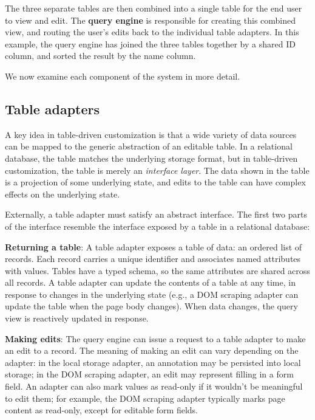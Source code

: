 \documentclass[sigplan,10pt,anonymous,review]{acmart}
\begin{document}
The three separate tables are then combined into a single table for the
end user to view and edit. The \textbf{query engine} is responsible for
creating this combined view, and routing the user's edits back to the
individual table adapters. In this example, the query engine has joined
the three tables together by a shared ID column, and sorted the result
by the name column.

We now examine each component of the system in more detail.

\hypertarget{table-adapters}{%
\subsection{Table adapters}\label{table-adapters}}

A key idea in table-driven customization is that a wide variety of data
sources can be mapped to the generic abstraction of an editable table.
In a relational database, the table matches the underlying storage
format, but in table-driven customization, the table is merely an
\emph{interface layer}. The data shown in the table is a projection of
some underlying state, and edits to the table can have complex effects
on the underlying state.

Externally, a table adapter must satisfy an abstract interface. The
first two parts of the interface resemble the interface exposed by a
table in a relational database:

\textbf{Returning a table}: A table adapter exposes a table of data: an
ordered list of records. Each record carries a unique identifier and
associates named attributes with values. Tables have a typed schema, so
the same attributes are shared across all records. A table adapter can
update the contents of a table at any time, in response to changes in
the underlying state (e.g., a DOM scraping adapter can update the table
when the page body changes). When data changes, the query view is
reactively updated in response.

\textbf{Making edits}: The query engine can issue a request to a table
adapter to make an edit to a record. The meaning of making an edit can
vary depending on the adapter: in the local storage adapter, an
annotation may be persisted into local storage; in the DOM scraping
adapter, an edit may represent filling in a form field. An adapter can
also mark values as read-only if it wouldn't be meaningful to edit them;
for example, the DOM scraping adapter typically marks page content as
read-only, except for editable form fields.
\end{document}
